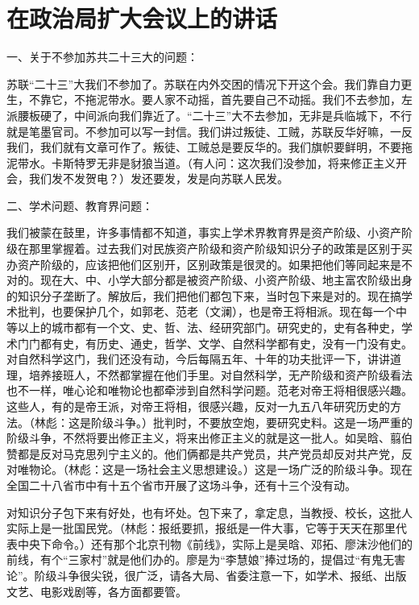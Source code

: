\section[在政治局扩大会议上的讲话（一九六六年三月二十曰华东）]{在政治局扩大会议上的讲话}


一、关于不参加苏共二十三大的问题：

苏联“二十三”大我们不参加了。苏联在内外交困的情况下开这个会。我们靠自力更生，不靠它，不拖泥带水。要人家不动摇，首先要自己不动摇。我们不去参加，左派腰板硬了，中间派向我们靠近了。“二十三”大不去参加，无非是兵临城下，不行就是笔墨官司。不参加可以写一封信。我们讲过叛徒、工贼，苏联反华好嘛，一反我们，我们就有文章可作了。叛徒、工贼总是要反华的。我们旗帜要鲜明，不要拖泥带水。卡斯特罗无非是豺狼当道。（有人问：这次我们没参加，将来修正主义开会，我们发不发贺电？）发还要发，发是向苏联人民发。

二、学术问题、教育界问题：

我们被蒙在鼓里，许多事情都不知道，事实上学术界教育界是资产阶级、小资产阶级在那里掌握着。过去我们对民族资产阶级和资产阶级知识分子的政策是区别于买办资产阶级的，应该把他们区别开，区别政策是很灵的。如果把他们等同起来是不对的。现在大、中、小学大部分都是被资产阶级、小资产阶级、地主富农阶级出身的知识分子垄断了。解放后，我们把他们都包下来，当时包下来是对的。现在搞学术批判，也要保护几个，如郭老、范老（文澜），也是帝王将相派。现在每一个中等以上的城市都有一个文、史、哲、法、经研究部门。研究史的，史有各种史，学术门门都有史，有历史、通史，哲学、文学、自然科学都有史，没有一门没有史。对自然科学这门，我们还没有动，今后每隔五年、十年的功夫批评一下，讲讲道理，培养接班人，不然都掌握在他们手里。对自然科学，无产阶级和资产阶级看法也不一样，唯心论和唯物论也都牵涉到自然科学问题。范老对帝王将相很感兴趣。这些人，有的是帝王派，对帝王将相，很感兴趣，反对一九五八年研究历史的方法。（林彪：这是阶级斗争。）批判时，不要放空炮，要研究史料。这是一场严重的阶级斗争，不然将要出修正主义，将来出修正主义的就是这一批人。如吴晗、翦伯赞都是反对马克思列宁主义的。他们俩都是共产党员，共产党员却反对共产党，反对唯物论。（林彪：这是一场社会主义思想建设。）这是一场广泛的阶级斗争。现在全国二十八省市中有十五个省市开展了这场斗争，还有十三个没有动。

对知识分子包下来有好处，也有坏处。包下来了，拿定息，当教授、校长，这批人实际上是一批国民党。（林彪：报纸要抓，报纸是一件大事，它等于天天在那里代表中央下命令。）还有那个北京刊物《前线》，实际上是吴晗、邓拓、廖沫沙他们的前线，有个“三家村”就是他们办的。廖是为“李慧娘”捧过场的，提倡过“有鬼无害论”。阶级斗争很尖锐，很广泛，请各大局、省委注意一下，如学术、报纸、出版文艺、电影戏剧等，各方面都要管。

